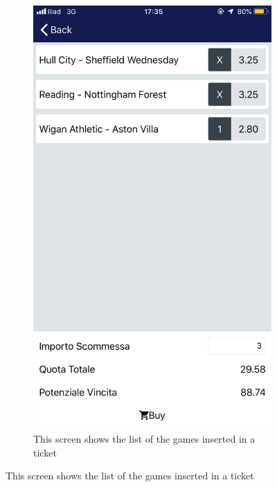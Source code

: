 \documentclass[numbers=noenddot, 12pt, a4paper, oneside]{scrbook}
\begin{document}
\begin{figure}[H]
\begin{subfigure}{.5\textwidth}
		\includegraphics[width=.8\linewidth]{images/Screen/Carrello}
		\caption{This screen shows the list of the games inserted in a ticket}
	\end{subfigure}
\end{figure}
\end{document}
